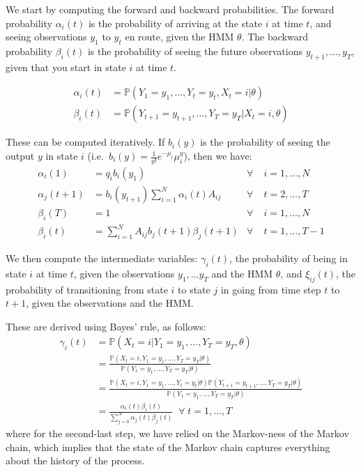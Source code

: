 \documentclass[11pt, twoside]{article}
\begin{document}
We start by computing the forward and backward probabilities. The forward probability $\alpha_i(t)$ is the probability of arriving at the state $i$ at time $t$, and seeing observations $y_1$ to $y_t$ en route, given the HMM $\theta$. The backward probability $\beta_i(t)$ is the probability of seeing the future observations $y_{t+1}, \ldots, y_T$, given that you start in state $i$ at time $t$.

\begin{align*}
	\alpha_i(t) &= \mathbb{P}(Y_1=y_1, \ldots, Y_t=y_t, X_t=i | \theta) \\
	\beta_i(t) &= \mathbb{P}(Y_{t+1}=y_{t+1}, \ldots, Y_T=y_T | X_t=i, \theta)
\end{align*}

These can be computed iteratively. If $b_i(y)$ is the probability of seeing the output $y$ in state $i$ (i.e.\ $b_i(y) = \frac{1}{y!} e^{-\mu_i} \mu_i^y$), then we have:
\begin{align*}
	\alpha_i(1) &= q_i b_i(y_1) & \forall &\; i = 1, \ldots, N \\
	\alpha_j(t+1) &= b_i(y_{t+1}) \sum_{i=1}^{N} \alpha_i(t) A_{ij} & \forall &\; t = 2, \ldots, T \\
	\beta_i(T) &= 1 & \forall &\; i = 1, \ldots, N \\
	\beta_i(t) &= \sum_{i=1}^N A_{ij} b_j(t+1) \beta_j(t+1) & \forall &\; t = 1, \ldots, T-1
\end{align*}

We then compute the intermediate variables: $\gamma_i(t)$, the probability of being in state $i$ at time $t$, given the observations $y_1, \ldots y_T$ and the HMM $\theta$, and $\xi_{ij}(t)$, the probability of transitioning from state $i$ to state $j$ in going from time step $t$ to $t+1$, given the observations and the HMM.

These are derived using Bayes' rule, as follows:
\begin{align*}
	\gamma_i(t) &= \mathbb{P}(X_t = i | Y_1=y_1, \ldots, Y_T=y_T, \theta) \\
	            &= \frac{\mathbb{P}(X_t = i, Y_1=y_1, \ldots, Y_T=y_T | \theta)}{\mathbb{P}(Y_1=y_1, \ldots, Y_T=y_T | \theta)} \\
	            &= \frac{\mathbb{P}(X_t = i, Y_1=y_1, \ldots, Y_t=y_t | \theta) \mathbb{P}(Y_{t+1}=y_{t+1}, \ldots, Y_T=y_T | \theta)}{\mathbb{P}(Y_1=y_1, \ldots, Y_T=y_T | \theta)} \\
	            &= \frac{\alpha_i(t) \beta_i(t)}{\sum_{j=0}^N \alpha_j(t) \beta_j(t)} \; \; \forall \; t = 1, \ldots, T
\end{align*}
where for the second-last step, we have relied on the Markov-ness of the Markov chain, which implies that the state of the Markov chain captures everything about the history of the process.
\end{document}
